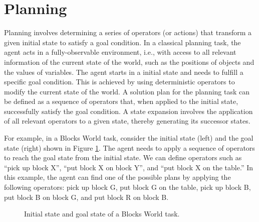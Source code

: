 \documentclass[ppgc,diss,english]{iiufrgs}
\begin{document}
\section{Planning}
\label{sec:intro-planning}
Planning involves determining a series of operators (or actions) that transform a given initial state to satisfy a goal condition.
In a classical planning task, the agent acts in a fully-observable environment, i.e., with access to all relevant information of the current state of the world, such as the positions of objects and the values of variables. The agent starts in a initial state and needs to fulfill a specific goal condition. This is achieved by using deterministic operators to modify the current state of the world. A solution plan for the planning task can be defined as a sequence of operators that, when applied to the initial state, successfully satisfy the goal condition. A state expansion involves the application of all relevant operators to a given state, thereby generating its successor states.

For example, in a Blocks World task, consider the initial state (left) and the goal state (right) shown in Figure \ref{fig:intro-blocks}. The agent needs to apply a sequence of operators to reach the goal state from the initial state. We can define operators such as ``pick up block X'', ``put block X on block Y'', and ``put block X on the table.'' In this example, the agent can find one of the possible plans by applying the following operators: pick up block G, put block G on the table, pick up block B, put block B on block G, and put block R on block B. %

\begin{figure}[ht]
\caption[Initial state of a Blocks World task]{Initial state and goal state of a Blocks World task.}
\vspace{\baselineskip}
\centering
{}
\label{fig:intro-blocks}
\end{figure}
\end{document}
